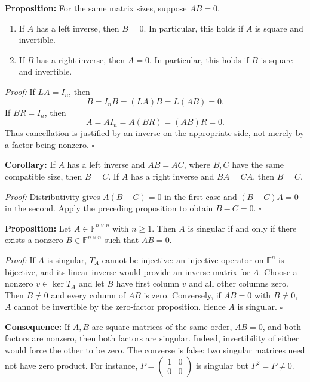 \documentclass[a4paper,11pt,abstract=true]{scrartcl}
\theoremstyle{dotlessP}
\theoremstyle{dotlessS}
\theoremstyle{remark}
\theoremstyle{definition}
\begin{document}
\begin{claim_box}
\textbf{Proposition:} For the same
matrix sizes, suppose $AB=0$.
\begin{enumerate}
    \item If $A$ has a left inverse, then $B=0$.
    In particular, this holds if $A$ is square and invertible.
    \item If $B$ has a right inverse, then $A=0$.
    In particular, this holds if $B$ is square and invertible.
\end{enumerate}

\textit{Proof:} If $LA=I_n$, then
\[
B=I_n B=(LA)B=L(AB)=0.
\]
If $BR=I_n$, then
\[
A=A I_n=A(BR)=(AB)R=0.
\]
Thus cancellation is justified by an inverse on the appropriate side,
not merely by a factor being nonzero. \hfill$\square$
\end{claim_box}

\begin{claim_box}
\textbf{Corollary:} If $A$ has a left inverse
and $AB=AC$, where $B,C$ have the same compatible size, then $B=C$.
If $A$ has a right inverse and $BA=CA$, then $B=C$.

\textit{Proof:} Distributivity gives $A(B-C)=0$ in the first case
and $(B-C)A=0$ in the second. Apply the preceding proposition to
obtain $B-C=0$. \hfill$\square$
\end{claim_box}

\begin{claim_box}
\textbf{Proposition:}
Let $A\in\mathbb{F}^{n\times n}$ with $n\geq1$. Then $A$ is singular
if and only if there exists a nonzero $B\in\mathbb{F}^{n\times n}$
such that $AB=0$.

\textit{Proof:} If $A$ is singular, $T_A$ cannot be injective:
an injective operator on $\mathbb{F}^n$ is bijective, and its linear
inverse would provide an inverse matrix for $A$. Choose a nonzero
$v\in\ker T_A$ and let $B$ have first column $v$ and all other
columns zero. Then $B\neq0$ and every column of $AB$ is zero.
Conversely, if $AB=0$ with $B\neq0$, $A$ cannot be invertible by
the zero-factor proposition. Hence $A$ is singular. \hfill$\square$
\end{claim_box}

\begin{claim_box}
\textbf{Consequence:} If $A,B$ are square matrices of the same
order, $AB=0$, and both factors are nonzero, then both factors are
singular. Indeed, invertibility of either would force the other to be
zero. The converse is false: two singular matrices need not have zero
product. For instance,
$P=\begin{pmatrix}1&0\\0&0\end{pmatrix}$ is singular but $P^2=P\neq0$.
\end{claim_box}
\end{document}
